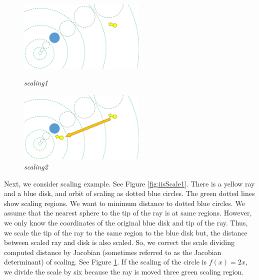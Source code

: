\begin{figure}[htbp]
 \begin{minipage}[t]{0.5\hsize}
  \center
  \includegraphics[height=1.35in, keepaspectratio]{img/preparation/iis3d/scaleIIS.png}
  \caption{\textit{scaling1}}
  \label{fig:iisScale1}
  \hspace*{\fill}
 \end{minipage}
 \begin{minipage}[t]{0.5\hsize}
  \center
  \includegraphics[height=1.35in, keepaspectratio]{img/preparation/iis3d/scaleIIS2.png}
  \caption{\textit{scaling2}}
  \label{fig:iisScale2}
  \hspace*{\fill}
 \end{minipage}
\end{figure}

Next, we consider scaling example. See Figure \ref{fig:iisScale1}.
There is a yellow ray and a blue disk, and orbit of scaling as
dotted blue circles.
The green dotted lines show scaling regions.
We want to minimum distance to dotted blue circles.
We assume that the nearest sphere to the tip of the ray is at
same regions. 
However, we only know the coordinates of the original blue
disk and tip of the ray.
Thus, we scale the tip of the ray to the same region to the blue disk
but, the distance between scaled ray and disk is also scaled.
So, we correct the scale dividing computed distance by 
Jacobian (sometimes referred to as the Jacobian determinant) of scaling.
See Figure \ref{fig:iisScale2}.
If the scaling of the circle is $f(x) = 2x$, we divide the scale by
six because the ray is moved three green scaling region.

